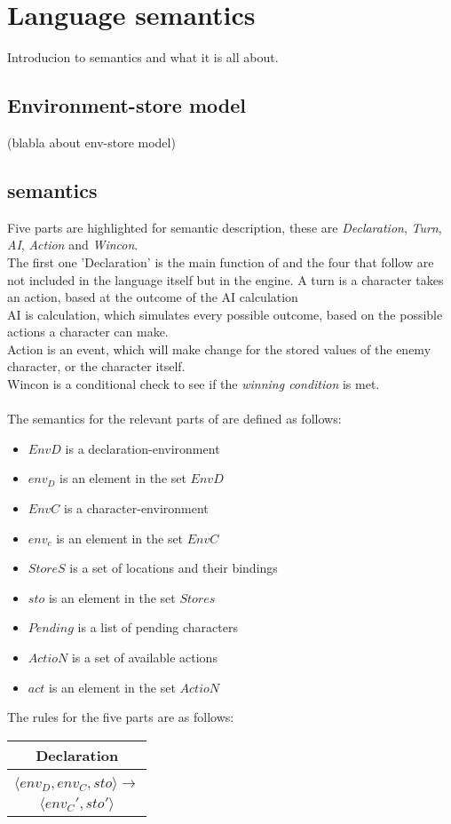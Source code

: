 \section{Language semantics}
Introducion to semantics and what it is all about.

\subsection{Environment-store model}
(blabla about env-store model)


\subsection{\langname{} semantics}
Five parts are highlighted for semantic description, these are  \emph{Declaration}, \emph{Turn}, \emph{AI}, \emph{Action} and \emph{Wincon}.\\
The first one 'Declaration' is the main function of \langname{} and the four that follow are not included in the language itself but in the engine.
A turn is a character takes an action, based at the outcome of the AI calculation \\
AI is calculation, which simulates every possible outcome, based on the possible actions a character can make. \\
Action is an event, which will make change for the stored values of the enemy character, or the character itself.\\
Wincon is a conditional check to see if the \emph{winning condition} is met.\\\\

The semantics for the relevant parts of \langname{} are defined as follows: \begin{itemize}
	\item $EnvD$ is a declaration-environment
	\item $env_{D}$ is an element in the set $EnvD$
	\item $EnvC$ is a character-environment
	\item $env_{c}$ is an element in the set $EnvC$
	\item $StoreS$ is a set of locations and their bindings
	\item $sto$ is an element in the set $Stores$
	\item $Pending$ is a list of pending characters
	\item $ActioN$ is a set of available actions
	\item $act$ is an element in the set $ActioN$
\end{itemize}
\pagebreak
The rules for the five parts are as follows:
\begin{center}
\begin{tabular}{ c }
\textbf{Declaration}\\
\hline
 \\
$\langle env_{D}, env_{C}, sto \rangle \rightarrow$\\
$\langle env_{C}', sto' \rangle$\\
\end{tabular}
\end{center}

